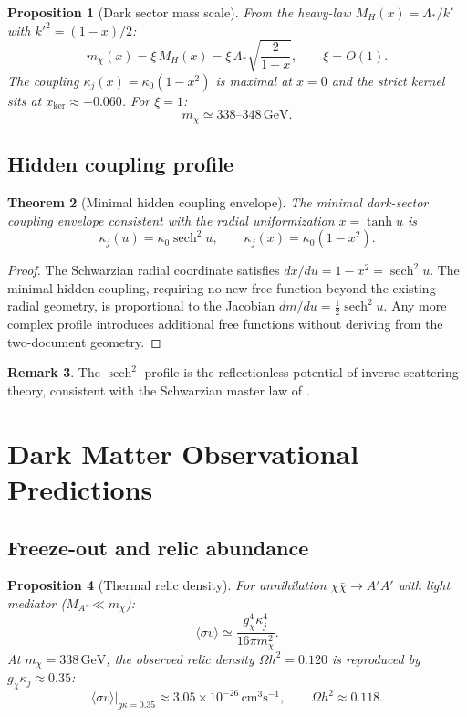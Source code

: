 \documentclass[12pt]{article}
\theoremstyle{plain}
\newtheorem{theorem}{Theorem}[section]
\newtheorem{proposition}[theorem]{Proposition}
\theoremstyle{definition}
\newtheorem{remark}[theorem]{Remark}
\numberwithin{equation}{section}
\DeclareMathOperator{\sech}{sech}
\begin{document}
\begin{proposition}[Dark sector mass scale]\label{prop:darkmass}
From the heavy-law $M_H(x)=\Lambda_*/k'$ with $k'^2=(1-x)/2$:
\[
m_{\chi}(x) = \xi\, M_H(x) = \xi\,\Lambda_*\sqrt{\frac{2}{1-x}},\qquad \xi=O(1).
\]
The coupling $\kappa_j(x)=\kappa_0(1-x^2)$ is maximal at $x=0$ and the
strict kernel sits at $x_{\ker}\approx-0.060$.  For $\xi=1$:
\[
\boxed{m_\chi \simeq 338\text{--}348\,\mathrm{GeV}.}
\]
\end{proposition}

\subsection{Hidden coupling profile}

\begin{theorem}[Minimal hidden coupling envelope]\label{thm:kappaj}
The minimal dark-sector coupling envelope consistent with the radial
uniformization $x=\tanh u$ is
\[
\kappa_j(u) = \kappa_0\sech^2 u,\qquad
\kappa_j(x) = \kappa_0(1-x^2).
\]
\end{theorem}

\begin{proof}
The Schwarzian radial coordinate satisfies $dx/du = 1-x^2 = \sech^2 u$.
The minimal hidden coupling, requiring no new free function beyond the
existing radial geometry, is proportional to the Jacobian $dm/du=\tfrac12\sech^2 u$.
Any more complex profile introduces additional free functions without
deriving from the two-document geometry.
\end{proof}

\begin{remark}
The $\sech^2$ profile is the reflectionless potential of inverse scattering
theory, consistent with the Schwarzian master law of \cite{YMmassGap}.
\end{remark}

\section{Dark Matter Observational Predictions}\label{sec:DMobs}

\subsection{Freeze-out and relic abundance}

\begin{proposition}[Thermal relic density]\label{prop:relic}
For annihilation $\chi\bar\chi\to A'A'$ with light mediator ($M_{A'}\ll m_\chi$):
\[
\langle\sigma v\rangle \simeq \frac{g_\chi^4\kappa_j^4}{16\pi m_\chi^2}.
\]
At $m_\chi=338\,\mathrm{GeV}$, the observed relic density $\Omega h^2=0.120$
is reproduced by $g_\chi\kappa_j\approx0.35$:
\[
\langle\sigma v\rangle\big|_{g\kappa=0.35}\approx3.05\times10^{-26}\,\mathrm{cm}^3\mathrm{s}^{-1},
\qquad \Omega h^2 \approx 0.118.
\]
\end{proposition}
\end{document}
